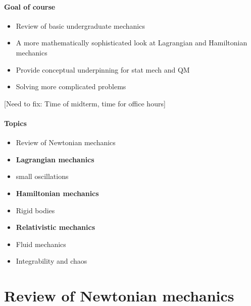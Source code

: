 \documentclass[12pt]{article} %
\begin{document}
\paragraph{Goal of course}
\begin{itemize}
\item Review of basic undergraduate mechanics
\item A more mathematically sophisticated look at Lagrangian and Hamiltonian mechanics
\item Provide conceptual underpinning for stat mech and QM
\item Solving more complicated problems
\end{itemize}

[Need to fix: Time of midterm, time for office hours]

\paragraph{Topics}
\begin{itemize}
\item Review of Newtonian mechanics
\item \textbf{Lagrangian mechanics}
\item small oscillations
\item \textbf{Hamiltonian mechanics}
\item Rigid bodies
\item \textbf{Relativistic mechanics}
\item Fluid mechanics
\item Integrability and chaos
\end{itemize}


\section{Review of Newtonian mechanics}
\end{document}
